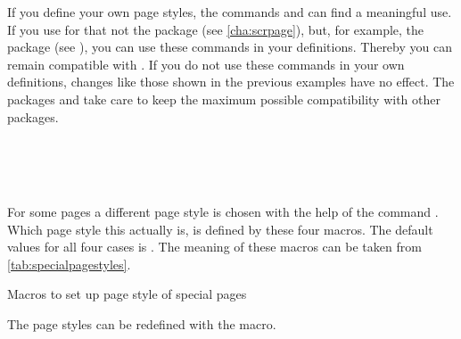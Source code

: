 If you define your own page styles, the commands
 and
 can find a meaningful use.
If you use for that not the \KOMAScript{} package 
(see \autoref{cha:scrpage}), but, for example, the package
 (see
\cite{package:fancyhdr}), you can use these commands in your
definitions.  Thereby you can remain compatible with \KOMAScript. If
you do not use these commands in your own definitions, changes like
those shown in the previous examples have no effect. The packages
 and
 take care to keep the
maximum possible compatibility with other packages.
%
%


\begin{Declaration}
  \\
  \\
  \\
\end{Declaration}%
%
%
%
%
For some pages a different page style is chosen with the help of the
command . Which page style this actually is, is
defined by these four macros. The default values for all four cases is
. The meaning of these macros can be taken from
\autoref{tab:specialpagestyles}.
%
\begin{table}
  \centering
  \caption{Macros to set up page style of special pages}
  \begin{desctabular}
  \end{desctabular}
\end{table}
%
The page styles can be redefined with the  macro.
